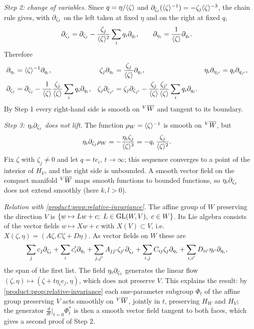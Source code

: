 \emph{Step 2: change of variables.} Since $q=\eta/\langle \zeta\rangle$ and
$\partial_{\zeta_j}(\langle \zeta\rangle^{-1})=-\zeta_j\langle \zeta\rangle^{-3}$, the chain rule gives, with
$\partial_{\zeta_j}$ on the left taken at fixed $\eta$ and on the right at fixed $q$,
\begin{equation*}
\partial_{\zeta_j}=\partial_{\zeta_j}-\frac{\zeta_j}{\langle \zeta\rangle^2}\sum_iq_i\partial_{q_i},\qquad
\partial_{\eta_i}=\frac1{\langle \zeta\rangle}\partial_{q_i}.
\end{equation*}
Therefore
\begin{align*}
\partial_{\eta_i}&=\langle \zeta\rangle^{-1}\partial_{q_i},&
\zeta_j\partial_{\eta_i}&=\frac{\zeta_j}{\langle \zeta\rangle}\partial_{q_i},&
\eta_i\partial_{\eta_{i'}}&=q_i\partial_{q_{i'}},\\
\partial_{\zeta_j}&=\partial_{\zeta_j}-\frac{1}{\langle \zeta\rangle}\frac{\zeta_j}{\langle \zeta\rangle}
\sum_iq_i\partial_{q_i},&
\zeta_j\partial_{\zeta_{j'}}&=\zeta_j\partial_{\zeta_{j'}}-\frac{\zeta_j}{\langle \zeta\rangle}
\frac{\zeta_{j'}}{\langle \zeta\rangle}\sum_iq_i\partial_{q_i}.
\end{align*}
By Step 1 every right-hand side is smooth on ${}^{V}\overline{W}$ and tangent to its boundary.

\emph{Step 3: $\eta_i\partial_{\zeta_j}$ does not lift.} The function $\rho_W=\langle \zeta\rangle^{-1}$
is smooth on ${}^{V}\overline{W}$, but
\begin{equation*}
\eta_i\partial_{\zeta_j}\rho_W=-\frac{\eta_i\zeta_j}{\langle \zeta\rangle^3}=-q_i\,\frac{\zeta_j}{\langle \zeta\rangle^{2}} .
\end{equation*}
Fix $\zeta$ with $\zeta_j\neq0$ and let $q=te_i$, $t\to\infty$; this sequence
converges to a point of the interior of $H_V$, and the right side is unbounded. A
smooth vector field on the compact manifold ${}^{V}\overline{W}$ maps smooth functions to
bounded functions, so $\eta_i\partial_{\zeta_j}$ does not extend smoothly (here
$k,l>0$).

\emph{Relation with \cref{product:prop:relative-invariance}.} The affine group of
$W$ preserving the direction $V$ is $\{w\mapsto Lw+c;\ L\in\operatorname{GL}(W,V),\ c\in W\}$. Its
Lie algebra consists of the vector fields $w\mapsto Xw+c$ with $X(V)\subset V$, i.e.\
$X(\zeta,\eta)=(A\zeta,C\zeta+D\eta)$. As vector fields on $W$ these are
\begin{equation*}
\sum_jc_j\partial_{\zeta_j}+\sum_ic'_i\partial_{\eta_i}+\sum_{j,j'}A_{jj'}\zeta_{j'}\partial_{\zeta_j}
+\sum_{i,j}C_{ij}\zeta_j\partial_{\eta_i}+\sum_{i,i'}D_{ii'}\eta_{i'}\partial_{\eta_i},
\end{equation*}
the span of the first list. The field $\eta_i\partial_{\zeta_j}$ generates the linear
flow $(\zeta,\eta)\mapsto(\zeta+t\eta_ie_j,\eta)$, which does not preserve $V$.
This explains the result: by \cref{product:prop:relative-invariance} each
one-parameter subgroup $\Phi_t$ of the affine group preserving $V$ acts smoothly on
${}^{V}\overline{W}$, jointly in $t$, preserving $H_W$ and $H_V$; the generator
$\frac{d}{dt}\big|_{t=0}\Phi_t^*$ is then a smooth vector field tangent to both
faces, which gives a second proof of Step 2.

